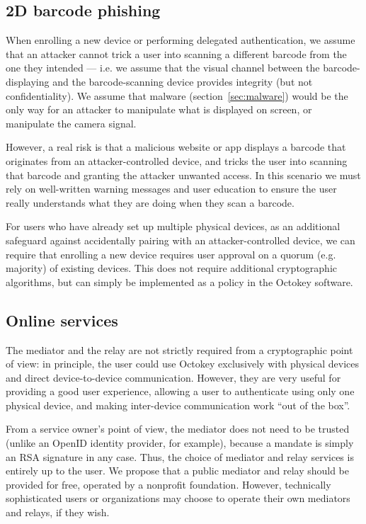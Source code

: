 \subsection{2D barcode phishing}\label{sec:barcode-phishing}

When enrolling a new device or performing delegated authentication, we assume that an attacker
cannot trick a user into scanning a different barcode from the one they intended --- i.e. we assume
that the visual channel between the barcode-displaying and the barcode-scanning device provides
integrity (but not confidentiality). We assume that malware (section~\ref{sec:malware}) would be the
only way for an attacker to manipulate what is displayed on screen, or manipulate the camera signal.

However, a real risk is that a malicious website or app displays a barcode that originates from an
attacker-controlled device, and tricks the user into scanning that barcode and granting the attacker
unwanted access. In this scenario we must rely on well-written warning messages and user education
to ensure the user really understands what they are doing when they scan a barcode.

For users who have already set up multiple physical devices, as an additional safeguard against
accidentally pairing with an attacker-controlled device, we can require that enrolling a new device
requires user approval on a quorum (e.g. majority) of existing devices. This does not require
additional cryptographic algorithms, but can simply be implemented as a policy in the Octokey
software.

\subsection{Online services}\label{sec:mediator-sec}

The mediator and the relay are not strictly required from a cryptographic point of view: in
principle, the user could use Octokey exclusively with physical devices and direct device-to-device
communication. However, they are very useful for providing a good user experience, allowing a user
to authenticate using only one physical device, and making inter-device communication work ``out of
the box''.

From a service owner's point of view, the mediator does not need to be trusted (unlike an OpenID
identity provider, for example), because a mandate is simply an RSA signature in any case. Thus, the
choice of mediator and relay services is entirely up to the user. We propose that a public mediator
and relay should be provided for free, operated by a nonprofit foundation. However, technically
sophisticated users or organizations may choose to operate their own mediators and relays, if they
wish.

